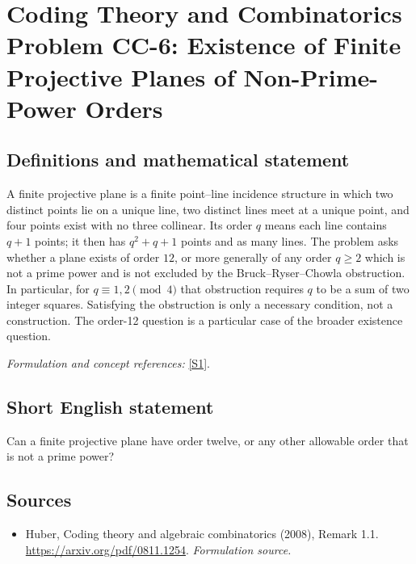 \documentclass[11pt]{article}
\begin{document}
\section*{\texorpdfstring{Coding Theory and Combinatorics Problem CC-6: Existence of Finite Projective Planes of Non-Prime-Power Orders}{Coding Theory and Combinatorics Problem CC-6: Existence of Finite Projective Planes of Non-Prime-Power Orders}}\label{404}
\subsection{Definitions and mathematical statement}
A finite projective plane is a finite point--line incidence structure in which two distinct points lie on a unique line, two distinct lines meet at a unique point, and four points exist with no three collinear. Its order $q$ means each line contains $q+1$ points; it then has $q^2+q+1$ points and as many lines. The problem asks whether a plane exists of order $12$, or more generally of any order $q\ge2$ which is not a prime power and is not excluded by the Bruck--Ryser--Chowla obstruction. In particular, for $q\equiv1,2\pmod4$ that obstruction requires $q$ to be a sum of two integer squares. Satisfying the obstruction is only a necessary condition, not a construction. The order-12 question is a particular case of the broader existence question.
\par\smallskip\textit{Formulation and concept references:} \href{https://arxiv.org/pdf/0811.1254}{[S1]}.

\subsection{Short English statement}
Can a finite projective plane have order twelve, or any other allowable order that is not a prime power?
\subsection{Sources}
\begin{itemize}
\item[S1]Huber, Coding theory and algebraic combinatorics (2008), Remark 1.1.
\url{https://arxiv.org/pdf/0811.1254}.
\textit{Formulation source.}
\end{itemize}
\end{document}
